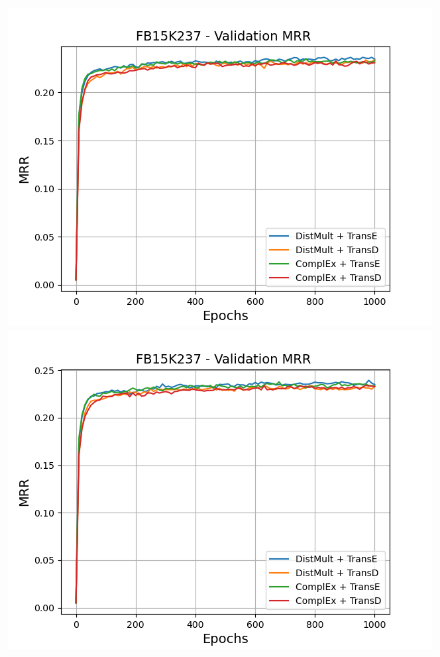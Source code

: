\begin{figure}[H]
    \centering
    \begin{minipage}{.45\textwidth}
      \centering
      \includegraphics[width=0.9\linewidth]{figures/results/gan_train/not_pretrained/uncertainty/max_distribution/entropy/fb15k237/1k_epochs/uncertainty_fb15k237_mrrs.png}
    \end{minipage}%
    \begin{minipage}{.45\textwidth}
      \centering
      \includegraphics[width=0.9\linewidth]{figures/results/gan_train/not_pretrained/uncertainty/max_distribution/least_confidence/fb15k237/uncertainty_fb15k237_mrrs.png}
    \end{minipage}
    \begin{minipage}{.45\textwidth}
      \centering

\end{minipage}
\end{figure}
